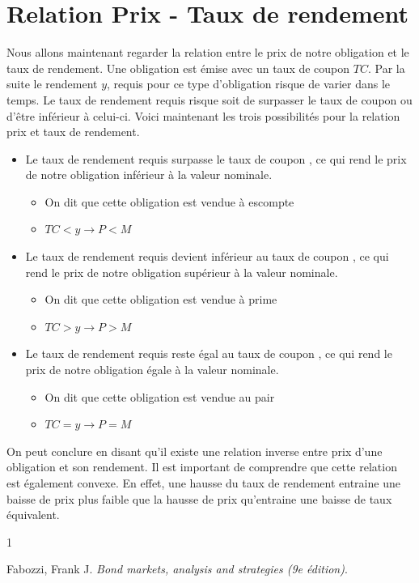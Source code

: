\documentclass[letterpaper, 12pt]{article}
\newcommand{\1}{\mathds{1}}	%
\theoremstyle{definition}
\begin{document}
\section{Relation Prix - Taux de rendement}
Nous allons maintenant regarder la relation entre le prix de notre obligation et le taux de rendement. Une obligation est émise avec un taux de coupon $TC$. Par la suite le rendement $y$, requis pour ce type d'obligation risque de varier dans le temps. Le taux de rendement requis risque soit de surpasser le taux de coupon ou d'être inférieur à celui-ci. Voici maintenant les trois possibilités pour la relation prix et taux de rendement. 
\begin{itemize}
\item Le taux de rendement requis surpasse le taux de coupon , ce qui rend le prix de notre obligation inférieur à la valeur nominale. 
\begin{itemize}
\item On dit que cette obligation est vendue à escompte 
\item $TC < y \rightarrow P < M$
\end{itemize}
\item Le taux de rendement requis devient inférieur au taux de coupon , ce qui rend le prix de notre obligation supérieur à la valeur nominale. 
\begin{itemize}
\item On dit que cette obligation est vendue à prime
\item $TC > y \rightarrow P > M$
\end{itemize}
\item Le taux de rendement requis reste égal au taux de coupon , ce qui rend le prix de notre obligation égale à la valeur nominale. 
\begin{itemize}
\item On dit que cette obligation est vendue au pair
\item $TC = y \rightarrow P = M$
\end{itemize}
\end{itemize}
On peut conclure en disant qu'il existe une relation inverse entre prix d'une obligation et son rendement. Il est important de comprendre que cette relation est également convexe. En effet, une hausse du taux de rendement entraine une baisse de prix plus faible que la hausse de prix qu'entraine une baisse de taux équivalent.




\begin{thebibliography}{1}

   Fabozzi, Frank J.
   \textit{Bond markets, analysis and strategies (9e édition)}.
 


\end{thebibliography}

\end{document}
